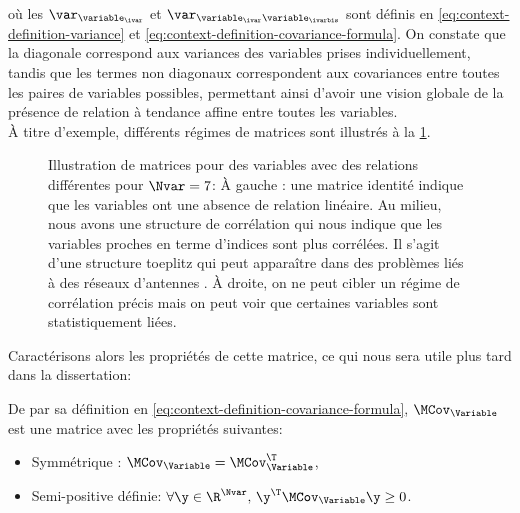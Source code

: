 où les $\var_{\variable_\ivar}$ et
$\var_{\variable_\ivar\variable_\ivarbis}$ sont définis en
\cref{eq:context-definition-variance} et
\cref{eq:context-definition-covariance-formula}.
On constate que la diagonale correspond aux variances des variables
prises individuellement, tandis que les termes non diagonaux
correspondent aux covariances entre toutes les paires de variables
possibles, permettant ainsi d'avoir une vision globale de la présence de relation à tendance affine entre toutes les variables. \\


\`A titre d'exemple, différents régimes de matrices sont illustrés à la \cref{fig:context-covariance-regimes}.

\begin{figure}[h]
  \centering
  
  \provCovmatexamplesQR[1cm]
  \caption{Illustration de matrices pour des variables avec des relations différentes pour $\Nvar=7$: À gauche : une matrice identité indique que les variables ont une absence de relation linéaire. Au milieu, nous avons une structure de corrélation qui nous indique que les variables proches en terme d'indices sont plus corrélées. Il s'agit d'une structure toeplitz qui peut apparaître dans des problèmes liés à des réseaux d'antennes . À droite, on ne peut cibler un régime de corrélation précis mais on peut voir que certaines variables sont statistiquement liées. \provCovmatexamples}
  \label{fig:context-covariance-regimes}
\end{figure}


Caractérisons alors les propriétés de cette matrice, ce qui nous sera utile plus tard dans la dissertation:

\begin{property}[{SPD}]
\label{prop:context-prop-covariance}
  De par sa définition en \cref{eq:context-definition-covariance-formula}, $\MCov_\Variable$ est une matrice avec les propriétés suivantes:
  \begin{itemize}
    \item Symmétrique : $\MCov_\Variable=\MCov_\Variable^\T$,
    \item Semi-positive définie: $\forall \y\in\R^\Nvar,\, \y^\T\MCov_\Variable\y\geq 0$.
  \end{itemize}
\end{property}


